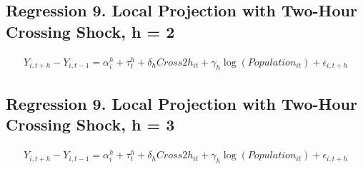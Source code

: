\documentclass[a4paper, 10pt]{article}
\begin{document}
\begin{table}[H]
\centering
\caption{Regression 9. Local Projection with Two-Hour Crossing Shock, h = 1: 의사}

\end{table}

\subsection{Regression 9. Local Projection with Two-Hour Crossing Shock, h = 2}
\begin{align*}
    Y_{i,t+h}-Y_{i,t-1}=\alpha_i^h+\tau_t^h+\delta_h Cross2h_{it}+\gamma_h\log(Population_{it})+\epsilon_{i,t+h}
\end{align*}
\begin{table}[H]
\centering
\caption{Regression 9. Local Projection with Two-Hour Crossing Shock, h = 2: 의원}

\end{table}

\begin{table}[H]
\centering
\caption{Regression 9. Local Projection with Two-Hour Crossing Shock, h = 2: 병원}

\end{table}

\begin{table}[H]
\centering
\caption{Regression 9. Local Projection with Two-Hour Crossing Shock, h = 2: 종합병원}

\end{table}

\begin{table}[H]
\centering
\caption{Regression 9. Local Projection with Two-Hour Crossing Shock, h = 2: 상급종합병원}

\end{table}

\begin{table}[H]
\centering
\caption{Regression 9. Local Projection with Two-Hour Crossing Shock, h = 2: 의사}

\end{table}

\subsection{Regression 9. Local Projection with Two-Hour Crossing Shock, h = 3}
\begin{align*}
    Y_{i,t+h}-Y_{i,t-1}=\alpha_i^h+\tau_t^h+\delta_h Cross2h_{it}+\gamma_h\log(Population_{it})+\epsilon_{i,t+h}
\end{align*}
\begin{table}[H]
\centering
\caption{Regression 9. Local Projection with Two-Hour Crossing Shock, h = 3: 의원}

\end{table}
\end{document}
